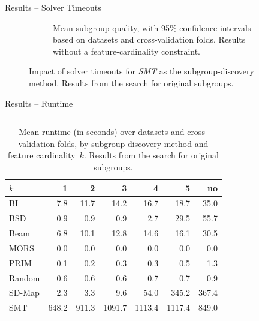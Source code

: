 \documentclass[en, navbaroff, handout]{sdqbeamer}
\begin{document}
\begin{frame}[t]{Results -- Solver Timeouts}
\begin{figure}
\begin{subfigure}[t]{0.32\textwidth}
			\caption{
				Mean subgroup quality, with 95\% confidence intervals based on datasets and cross-validation folds.
				Results without a feature-cardinality constraint.
			}
			\label{fig:csd:timeouts-nwracc}
		\end{subfigure}
		\caption*{
			Impact of solver timeouts for \emph{SMT} as the subgroup-discovery method.
			Results from the search for original subgroups.
		}
		\label{fig:csd:timeouts}
	\end{figure}
\end{frame}

\begin{frame}[t]{Results -- Runtime}
	\begin{columns}[T]
		\begin{column}{\kitthreecolumns}
			\begin{table}
				\centering
				\caption*{
					Mean runtime (in seconds) over datasets and cross-validation folds, by subgroup-discovery method and feature cardinality~$k$.
					Results from the search for original subgroups.
				}
				\begin{tabular}{lrrrrrr}
					\toprule
					$k$ & 1 & 2 & 3 & 4 & 5 & no \\
					\midrule
					BI & 7.8 & 11.7 & 14.2 & 16.7 & 18.7 & 35.0 \\
					BSD & 0.9 & 0.9 & 0.9 & 2.7 & 29.5 & 55.7 \\
					Beam & 6.8 & 10.1 & 12.8 & 14.6 & 16.1 & 30.5 \\
					MORS & 0.0 & 0.0 & 0.0 & 0.0 & 0.0 & 0.0 \\
					PRIM & 0.1 & 0.2 & 0.3 & 0.3 & 0.5 & 1.3 \\
					Random & 0.6 & 0.6 & 0.6 & 0.7 & 0.7 & 0.9 \\
					SD-Map & 2.3 & 3.3 & 9.6 & 54.0 & 345.2 & 367.4 \\
					SMT & 648.2 & 911.3 & 1091.7 & 1113.4 & 1117.4 & 849.0 \\
					\bottomrule
				\end{tabular}
				\label{tab:csd:cardinality-runtime}

\end{table}
\end{column}
\end{columns}
\end{frame}
\end{document}
